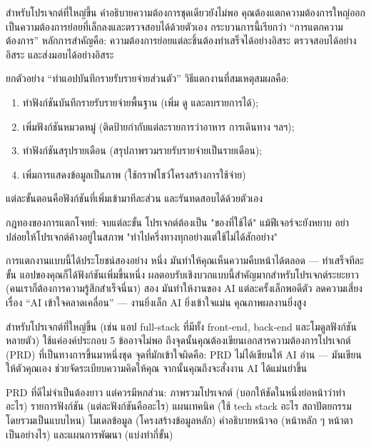 
สำหรับโปรเจกต์ที่ใหญ่ขึ้น คำอธิบายความต้องการชุดเดียวยังไม่พอ คุณต้องแตกความต้องการใหญ่ออกเป็นความต้องการย่อยที่เล็กลงและตรวจสอบได้ด้วยตัวเอง กระบวนการนี้เรียกว่า “การแตกความต้องการ” หลักการสำคัญคือ: ความต้องการย่อยแต่ละชิ้นต้องทำเสร็จได้อย่างอิสระ ตรวจสอบได้อย่างอิสระ และส่งมอบได้อย่างอิสระ

ยกตัวอย่าง “ทำแอปบันทึกรายรับรายจ่ายส่วนตัว” วิธีแตกงานที่สมเหตุสมผลคือ:

\begin{enumerate}
  \item ทำฟังก์ชันบันทึกรายรับรายจ่ายพื้นฐาน (เพิ่ม ดู และลบรายการได้);
  \item เพิ่มฟังก์ชันหมวดหมู่ (ติดป้ายกำกับแต่ละรายการว่าอาหาร การเดินทาง ฯลฯ);
  \item ทำฟังก์ชันสรุปรายเดือน (สรุปภาพรวมรายรับรายจ่ายเป็นรายเดือน);
  \item เพิ่มการแสดงข้อมูลเป็นภาพ (ใช้กราฟโชว์โครงสร้างการใช้จ่าย)
\end{enumerate}

แต่ละขั้นตอนคือฟังก์ชันที่เพิ่มเข้ามาทีละส่วน และรันทดสอบได้ด้วยตัวเอง

กฎทองของการแตกโจทย์: จบแต่ละขั้น โปรเจกต์ต้องเป็น "ของที่ใช้ได้" แม้ฟีเจอร์จะยังหยาบ อย่าปล่อยให้โปรเจกต์ค้างอยู่ในสภาพ "ทำไปครึ่งทางทุกอย่างแต่ใช้ไม่ได้สักอย่าง"

การแตกงานแบบนี้ได้ประโยชน์สองอย่าง หนึ่ง มันทำให้คุณเห็นความคืบหน้าได้ตลอด — ทำเสร็จทีละขั้น แอปของคุณก็ได้ฟังก์ชันเพิ่มขึ้นหนึ่ง ผลตอบรับเชิงบวกแบบนี้สำคัญมากสำหรับโปรเจกต์ระยะยาว (คนเราก็ต้องการความรู้สึกสำเร็จนี่นา) สอง มันทำให้งานของ AI แต่ละครั้งเล็กพอดีตัว ลดความเสี่ยงเรื่อง “AI เข้าใจคลาดเคลื่อน” — งานยิ่งเล็ก AI ยิ่งเข้าใจแม่น คุณภาพผลงานยิ่งสูง


สำหรับโปรเจกต์ที่ใหญ่ขึ้น (เช่น แอป full-stack ที่มีทั้ง front-end, back-end และโมดูลฟังก์ชันหลายตัว) ใช้แค่องค์ประกอบ 5 ข้ออาจไม่พอ ถึงจุดนั้นคุณต้องเขียนเอกสารความต้องการโปรเจกต์ (PRD) ที่เป็นทางการขึ้นมาหนึ่งชุด จุดที่มักเข้าใจผิดคือ: PRD ไม่ได้เขียนให้ AI อ่าน — มันเขียนให้ตัวคุณเอง ช่วยจัดระเบียบความคิดให้คุณ จากนั้นคุณถึงจะสั่งงาน AI ได้แม่นยำขึ้น

PRD ที่ดีไม่จำเป็นต้องยาว แต่ควรมีหกส่วน: ภาพรวมโปรเจกต์ (บอกให้ชัดในหนึ่งย่อหน้าว่าทำอะไร) รายการฟังก์ชัน (แต่ละฟังก์ชันคืออะไร) แผนเทคนิค (ใช้ tech stack อะไร สถาปัตยกรรมโดยรวมเป็นแบบไหน) โมเดลข้อมูล (โครงสร้างข้อมูลหลัก) คำอธิบายหน้าจอ (หน้าหลัก ๆ หน้าตาเป็นอย่างไร) และแผนการพัฒนา (แบ่งทำกี่ขั้น)

